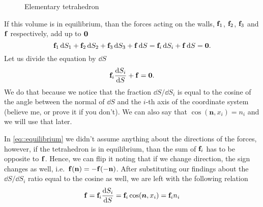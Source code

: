 \documentclass[a4paper]{article}
\begin{document}
\begin{figure}[bh!]
  \caption{Elementary tetrahedron}
  \label{fig::force_tetrahedron}
\end{figure}

If this volume is in equilibrium, than the forces acting on the walls, 
\(\vb{f}_1\), \(\vb{f}_2\), \(\vb{f}_3\) and \(\vb{f}\) respectively,
add up to \(\vb{0}\)
\begin{equation}\label{eq::equilibrium}
  \vb{f}_1 \dd{S_1} 
  + \vb{f}_2 \dd{S_2} 
  + \vb{f}_3 \dd{S_3} 
  + \vb{f} \dd{S} = \vb{f}_i \dd{S_i} + \vb{f} \dd{S} = \vb{0}.
\end{equation}
Let us divide the equation by \(\dd{S}\)
\[
  \vb{f}_i \dfrac{\dd{S_i}}{\dd{S}} + \vb{f} = \vb{0}.
\]
We do that because we notice that the fraction \(\dd{S} / \dd{S_i}\) is
equal to the cosine of the angle between the normal of \(\dd{S}\) and 
the \(i\)-th axis of the coordinate system (believe me, or prove it 
if you don't). We can also say that \(\cos(\bm{n}, x_i) = n_i\) and we will
use that later. 

In \autoref{eq::equilibrium} we didn't assume anything about the directions
of the forces, however, if the tetrahedron is in equilibrium, than the sum of 
\(\vb{f}_i\) has to be opposite to \(\vb{f}\). Hence, we can flip it noting
that if we change direction, the sign changes as well, i.e.\ 
\(\vb{f}(\vb{n}) = -\vb{f}(-\vb{n})\). 
After substituting our  findings about the 
\(\dd{S} / \dd{S_i}\) ratio equal to the cosine as well, we are left with the following relation
\[
  \vb{f} = \vb{f}_i \dfrac{\dd{S_i}}{\dd{S}} 
  = \vb{f}_i\cos(\bm{n}, x_i) 
  = \vb{f}_i n_i  
\]
\end{document}
